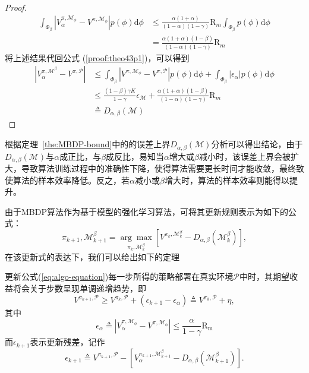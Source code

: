 \begin{proof}
\begin{align}
\int_{\Phi_\beta}\left|{V}_\alpha^{\pi, \mathcal{M}_{\phi}} - {V}^{\pi,\mathcal{M}_{\phi}}\right|p(\phi)\mathrm{d}\phi&\leq \frac{\alpha(1+\alpha)}{(1-\alpha)(1-\gamma)}\mathrm{R}_m\int_{\Phi_\beta}p(\phi)\mathrm{d}\phi\\
&=\frac{\alpha(1+\alpha)(1-\beta)}{(1-\alpha)(1-\gamma)}\mathrm{R}_m \label{proof:theo43p3}
\end{align}
将上述结果代回公式 (\ref{proof:theo43p1})，可以得到
\begin{align}
\left|{V}_\alpha^{\pi, \mathcal{M}^\beta}-{V}^{\pi, \mathcal{P}}\right| &\leq \int_{\Phi_\beta}\left|{V}^{\pi, \mathcal{M}_{\phi}}-{V}^{\pi, \mathcal{P}}\right|p(\phi)\mathrm{d}\phi+\int_{\Phi_\beta}\left|\epsilon_\alpha\right|p(\phi)\mathrm{d}\phi\\
&\leq \frac{(1-\beta)\gamma K}{1-\gamma}\epsilon_{\mathcal{M}}+\frac{\alpha(1+\alpha)(1-\beta)}{(1-\alpha)(1-\gamma)}\mathrm{R}_m\\
&\triangleq D_{\alpha,\beta}(\mathcal{M})
\end{align}

\end{proof}

根据定理~\ref{the:MBDP-bound}中的的误差上界$D_{\alpha,\beta}(\mathcal{M})$分析可以得出结论，由于$D_{\alpha,\beta}(\mathcal{M})$与$\alpha$成正比，与$\beta$成反比，易知当$\alpha$增大或$\beta$减小时，该误差上界会被扩大，导致算法训练过程中的准确性下降，使得算法需要更长时间才能收敛，最终致使算法的样本效率降低。反之，若$\alpha$减小或$\beta$增大时，算法的样本效率则能得以提升。

由于MBDP算法作为基于模型的强化学习算法，可将其更新规则表示为如下的公式：
\begin{equation}
    \pi_{k+1}, \mathcal{M}^\beta_{k+1}=\underset{\pi_k, \mathcal{M}_k^\beta}{\arg\max}\left[{V}^{\pi_k, \mathcal{M}_k^\beta}-D_{\alpha,\beta}(\mathcal{M}^\beta_k)\right],
\label{eq:algo-equation}
\end{equation}
在该更新式的表达下，我们可以给出如下的定理
\begin{theorem}
更新公式(\ref{eq:algo-equation})每一步所得的策略部署在真实环境$\mathcal{P}$中时，其期望收益将会关于步数呈现单调递增趋势，即
\begin{equation}
    {V}^{\pi_{k+1}, \mathcal{P}}\geq {V}^{\pi_{k}, \mathcal{P}} + (\epsilon_{k+1} - \epsilon_\alpha) \triangleq {V}^{\pi_{k}, \mathcal{P}} + \eta,
\end{equation}
其中
\begin{equation}
    \epsilon_\alpha \triangleq |{V}_\alpha^{\pi, \mathcal{M}_{\phi}} - {V}^{\pi,\mathcal{M}_{\phi}}|   \leq \frac{\alpha}{1-\gamma}\mathrm{R_{m}}
\end{equation}
而$\epsilon_{k+1}$表示更新残差，记作
\begin{equation}
    \epsilon_{k+1} \triangleq {V}^{\pi_{k+1}, \mathcal{P}} - \left[{V}_{\alpha}^{\pi_{k+1}, \mathcal{M}_{k+1}^\beta} - D_{\alpha,\beta}(\mathcal{M}_{k+1}^\beta)\right].
\end{equation}
\label{prop:performance}
\end{theorem}

